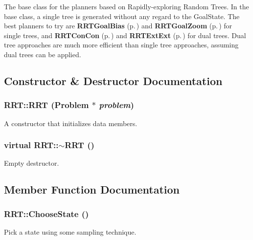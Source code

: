 The base class for the planners based on Rapidly-exploring  Random Trees. In the base class, a single tree is generated without any regard to the Goal\-State. The best planners to try are  {\bf RRTGoal\-Bias} {\rm (p.\,\pageref{classRRTGoalBias})} and {\bf RRTGoal\-Zoom} {\rm (p.\,\pageref{classRRTGoalZoom})} for single trees, and {\bf RRTCon\-Con} {\rm (p.\,\pageref{classRRTConCon})} and  {\bf RRTExt\-Ext} {\rm (p.\,\pageref{classRRTExtExt})} for dual trees. Dual tree approaches are much more efficient than single tree approaches, assuming dual trees can be applied. 



\subsection{Constructor \& Destructor Documentation}
\subsubsection{\setlength{\rightskip}{0pt plus 5cm}RRT::RRT ({\bf Problem} $\ast$ {\em problem})}\label{classRRT_a0}


A constructor that initializes data members.

\subsubsection{\setlength{\rightskip}{0pt plus 5cm}virtual RRT::$\sim$RRT ()\hspace{0.3cm}{\tt  [inline, virtual]}}\label{classRRT_a1}


Empty destructor.



\subsection{Member Function Documentation}
\subsubsection{ RRT::Choose\-State ()\hspace{0.3cm}{\tt  [protected, virtual]}}\label{classRRT_b4}


Pick a state using some sampling technique.



